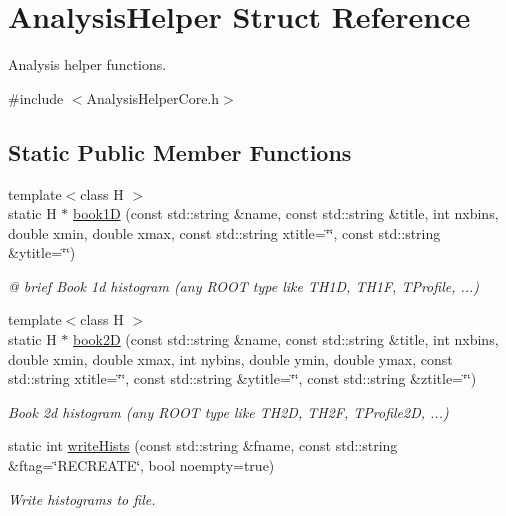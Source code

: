 \hypertarget{structAnalysisHelper}{}\section{Analysis\+Helper Struct Reference}
\label{structAnalysisHelper}


Analysis helper functions.  




{\ttfamily \#include $<$Analysis\+Helper\+Core.\+h$>$}

\subsection*{Static Public Member Functions}
\begin{DoxyCompactItemize}
\item 
{\footnotesize template$<$class H $>$ }\\static H $\ast$ \hyperlink{structAnalysisHelper_aed9c208e64246584fdd10a188121c137}{book1D} (const std\+::string \&name, const std\+::string \&title, int nxbins, double xmin, double xmax, const std\+::string xtitle=\char`\"{}\char`\"{}, const std\+::string \&ytitle=\char`\"{}\char`\"{})
\begin{DoxyCompactList}\small\item\em @ brief Book 1d histogram (any R\+O\+OT type like T\+H1D, T\+H1F, T\+Profile, ...) \end{DoxyCompactList}\item 
{\footnotesize template$<$class H $>$ }\\static H $\ast$ \hyperlink{structAnalysisHelper_aeaac2042accbd686e35518691e6b181b}{book2D} (const std\+::string \&name, const std\+::string \&title, int nxbins, double xmin, double xmax, int nybins, double ymin, double ymax, const std\+::string xtitle=\char`\"{}\char`\"{}, const std\+::string \&ytitle=\char`\"{}\char`\"{}, const std\+::string \&ztitle=\char`\"{}\char`\"{})
\begin{DoxyCompactList}\small\item\em Book 2d histogram (any R\+O\+OT type like T\+H2D, T\+H2F, T\+Profile2D, ...) \end{DoxyCompactList}\item 
static int \hyperlink{structAnalysisHelper_a8d8a117fe4692b12e538cf9f7b922e3a}{write\+Hists} (const std\+::string \&fname, const std\+::string \&ftag=\char`\"{}R\+E\+C\+R\+E\+A\+TE\char`\"{}, bool noempty=true)
\begin{DoxyCompactList}\small\item\em Write histograms to file. \end{DoxyCompactList}\end{DoxyCompactItemize}


